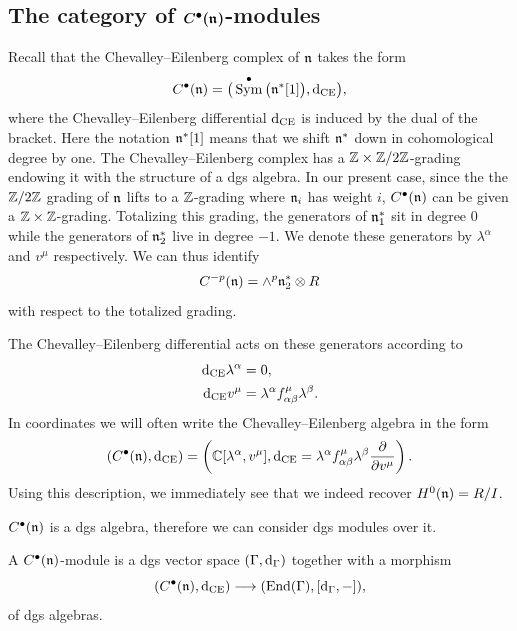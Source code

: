 \documentclass[pdftex]{sigma}
\numberwithin{equation}{section}
\def\d{{\rm d}}
\DeclareMathOperator{\End}{End}
\DeclareMathOperator{\Sym}{Sym}
\begin{document}
\subsection[The category of C\^{}bullet(n)-modules]{The category of $\boldsymbol{C^\bullet(\mathfrak n)}$-modules} \label{CE_module_section}
Recall that the Chevalley--Eilenberg complex of $\mathfrak n$ takes the form
\begin{equation*}
C^\bullet(\fn) = \big( \Sym^\bullet\big(\fn^*[1]\big) , \d_{\mathrm{CE}} \big),
\end{equation*}
where the Chevalley--Eilenberg differential $\d_{\mathrm{CE}}$ is induced by the dual of the bracket. Here the notation $\mathfrak n^*[1]$ means that we shift $\mathfrak n^*$ down in cohomological degree by one. The Chevalley--Eilenberg complex has a $\mathbb Z \times \mathbb Z/2\mathbb Z$-grading endowing it with the structure of a dgs algebra. In our present case, since the the $\mathbb Z/2\mathbb Z$ grading of $\mathfrak n$ lifts to a $\mathbb Z$-grading where $\mathfrak n_i$ has weight $i$, $C^\bullet(\mathfrak n)$ can be given a $\mathbb Z \times \mathbb Z$-grading. Totalizing this grading, the generators of $\mathfrak n_1^*$ sit in degree $0$ while the generators of $\mathfrak n_2^*$ live in degree $-1$. We denote these generators by $\lambda^\alpha$ and $v^\mu$ respectively. We can thus identify{\samepage
\begin{equation*}
C^{-p}(\mathfrak n) = \wedge^p \mathfrak n_2^* \otimes R
\end{equation*}
with respect to the totalized grading.}

The Chevalley--Eilenberg differential acts on these generators according to
\begin{equation*}
\begin{split}
\d_{\mathrm{CE}} \lambda^\alpha &= 0, \\
\d_{\mathrm{CE}} v^\mu &= \lambda^\alpha f^\mu_{\alpha \beta} \lambda^\beta.
\end{split}
\end{equation*}
In coordinates we will often write the Chevalley--Eilenberg algebra in the form
\begin{equation*}
\left( C^\bullet(\fn), \d_{\mathrm{CE}} \right) = \left( \CC[\lambda^\alpha ,v^\mu] , \d_{\mathrm{CE}} = \lambda^\alpha f^\mu_{\alpha \beta} \lambda^\beta \frac{\partial}{\partial v^\mu} \right) .
\end{equation*}
Using this description, we immediately see that we indeed recover $H^0(\mathfrak n) = R/I$.

$C^\bullet(\mathfrak n)$ is a dgs algebra, therefore we can consider dgs modules over it.
\begin{dfn}
	A $C^\bullet(\mathfrak n)$-module is a dgs vector space $(\Gamma, \d_\Gamma)$ together with a morphism
	\begin{equation*}
	(C^\bullet(\fn) , \d_{\mathrm{CE}}) \longrightarrow (\End(\Gamma) , [\d_\Gamma , -]),
	\end{equation*}
	of dgs algebras.
\end{dfn}
\end{document}
